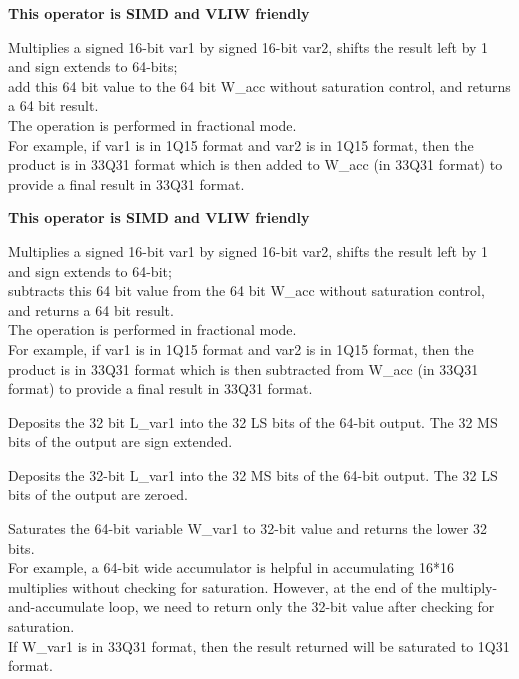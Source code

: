 
\textbf{ This operator is SIMD and VLIW friendly}

Multiplies a signed 16-bit var1 by signed 16-bit var2, shifts the result left by 1 and sign extends to 64-bits;\\
add this 64 bit value to the 64 bit W\_acc without saturation control, and returns a 64 bit result.\\
The operation is performed in fractional mode.\\
For example, if var1 is in 1Q15 format and var2 is in 1Q15 format, then the product is in 33Q31 format which is then added to W\_acc (in 33Q31 format) to provide a final result in 33Q31 format.


\textbf{ This operator is SIMD and VLIW friendly}

Multiplies a signed 16-bit var1 by signed 16-bit var2, shifts the result left by 1 and sign extends to 64-bit;\\
subtracts this 64 bit value from the 64 bit W\_acc without saturation control, and returns a 64 bit result.\\
The operation is performed in fractional mode.\\
For example, if var1 is in 1Q15 format and var2 is in 1Q15 format, then the product is in 33Q31 format which is then subtracted from W\_acc (in 33Q31 format) to provide a final result in 33Q31 format.


Deposits the 32 bit L\_var1 into the 32 LS bits of the 64-bit output. The 32 MS bits of the output are sign extended.


Deposits the 32-bit L\_var1 into the 32 MS bits of the 64-bit output. The 32 LS bits of the output are zeroed.


Saturates the 64-bit variable W\_var1 to 32-bit value and returns the lower 32 bits.\\
For example, a 64-bit wide accumulator is helpful in accumulating 16*16 multiplies without checking for saturation.
However, at the end of the multiply-and-accumulate loop, we need to return only the 32-bit value after checking for saturation.\\
If W\_var1 is in 33Q31 format, then the result returned will be saturated to 1Q31 format.

